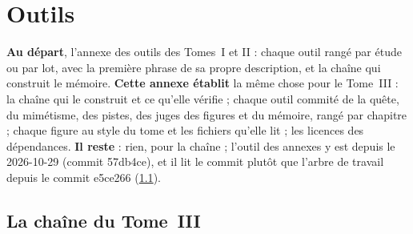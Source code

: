 
\chapter{Outils}\label{t3ann:outils}

\begin{origine}
\textbf{Au départ}, l'annexe des outils des Tomes~I et II : chaque outil rangé par étude ou par lot, avec la première phrase de sa propre description, et la chaîne qui construit le mémoire.
\textbf{Cette annexe établit} la même chose pour le Tome~III : la chaîne qui le construit et ce qu'elle vérifie ; chaque outil commité de la quête, du mimétisme, des pistes, des juges des figures et du mémoire, rangé par chapitre ; chaque figure au style du tome et les fichiers qu'elle lit ; les licences des dépendances.
\textbf{Il reste}  : rien, pour la chaîne ; l'outil des annexes y est depuis le 2026-10-29 (commit 57db4ce), et il lit le commit plutôt que l'arbre de travail depuis le commit e5ce266 (\cref{t3ann:sec:chaine}).
\end{origine}

\section{La chaîne du Tome~III}\label{t3ann:sec:chaine}

